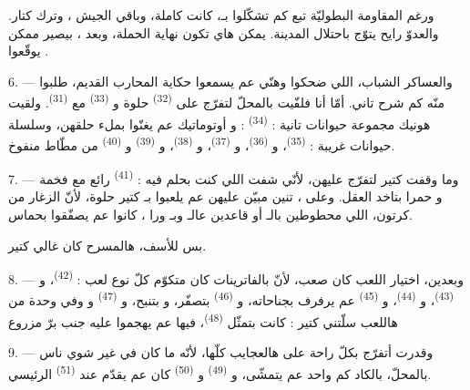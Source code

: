 ورغم المقاومة البطوليّة تبع كم  تشكّلوا بـ،
كانت  كاملة، وباقي الجيش ، وترك
 كتار. والعدوّ رايح يتوّج  باحتلال المدينة.
يمكن هاي تكون نهاية الحملة، وبعد ، بيصير ممكن يوقّعوا
.

\VUsaut{4.4mm}
\VUsaut{2.8mm}

6. --- والعساكر الشباب، اللي ضحكوا وهنّي عم يسمعوا حكاية المحارب
القديم، طلبوا منّه كم شرح تاني. أمّا أنا فلفّيت بالمحلّ لتفرّج على
 \textsuperscript{(32)} حلوة و
\textsuperscript{(33)} مع  \textsuperscript{(31)}. ولقيت
هونيك مجموعة حيوانات تانية : 
\textsuperscript{(34)} :  و أوتوماتيك عم
يغنّوا بملء حلقهن، وسلسلة حيوانات غريبة : 
\textsuperscript{(35)}، و \textsuperscript{(36)}،
و \textsuperscript{(37)}، و
\textsuperscript{(38)}، و \textsuperscript{(39)}
و \textsuperscript{(40)} من مطّاط منفوخ.

7. --- وما وقفت كتير لتفرّج عليهن، لأنّي شفت اللي كنت بحلم فيه :
 \textsuperscript{(41)} رائع مع 
فخمة و حمرا بتاخد العقل. وعلى ، تنين
 مبيّن عليهن عم يلعبوا  بـ
كتير حلوة، لأنّ  الزغار من كرتون، اللي محطوطين
بالـ أو قاعدين عالـ وبـ
ورا ، كانوا عم يصفّقوا بحماس.

بس للأسف، هالمسرح كان غالي كتير.

8. --- وبعدين، اختيار اللعب كان صعب، لأنّ بالفاترينات كان متكوّم كلّ
نوع لعب :  \textsuperscript{(42)}، و
\textsuperscript{(43)}، و \textsuperscript{(44)}،
و \textsuperscript{(45)} عم يرفرف بجناحاته، و
\textsuperscript{(46)} بتصفّر، و بتنبح،
و \textsuperscript{(47)} و وفي وحدة
من هاللعب سلّتني كتير : كانت بتمثّل 
\textsuperscript{(48)}، فيها  عم يهجموا عليه
 جنب برّ مزروع 


9. --- وقدرت أتفرّج بكلّ راحة على هالعجايب كلّها، لأنّه ما كان في
غير شوي ناس بالمحلّ، بالكاد كم واحد عم يتمشّى، و
\textsuperscript{(49)} و \textsuperscript{(50)} كان عم يقدّم
 عند  \textsuperscript{(51)} الرئيسي.

